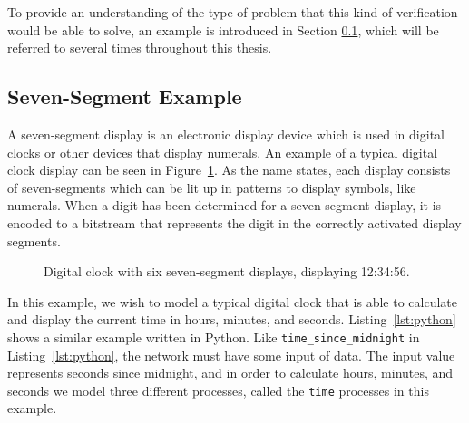 To provide an understanding of the type of problem that this kind of verification would be able to solve, an example is introduced in Section \ref{sec:example-seven_segment_intro}, which will be referred to several times throughout this thesis.

\subsection{Seven-Segment Example}
\label{sec:example-seven_segment_intro}
A seven-segment display is an electronic display device which is used in digital clocks or other devices that display numerals. An example of a typical digital clock display can be seen in Figure~\ref{fig:6_displays}. As the name states, each display consists of seven-segments which can be lit up in patterns to display symbols, like numerals.
When a digit has been determined for a seven-segment display, it is encoded to a bitstream that represents the digit in the correctly activated display segments.
\begin{figure}[!ht]
  \begin{center}
  \end{center}
  \caption{Digital clock with six seven-segment displays, displaying 12:34:56.}
  \label{fig:6_displays}
\end{figure}
In this example, we wish to model a typical digital clock that is able to calculate and display the current time in hours, minutes, and seconds. Listing~\ref{lst:python} shows a similar example written in Python. Like \texttt{time\_since\_midnight} in Listing~\ref{lst:python}, the network must have some input of data. The input value represents seconds since midnight, and in order to calculate hours, minutes, and seconds we model three different processes, called the \texttt{time} processes in this example.\\

